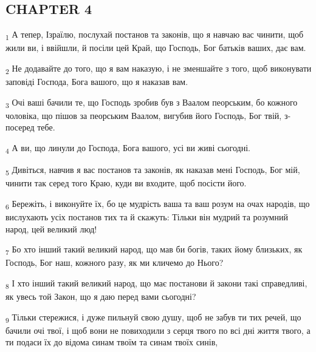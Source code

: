 \subsection{CHAPTER 4}
\begin{tcolorbox}
\textsubscript{1} А тепер, Ізраїлю, послухай постанов та законів, що я навчаю вас чинити, щоб жили ви, і ввійшли, й посіли цей Край, що Господь, Бог батьків ваших, дає вам.
\end{tcolorbox}
\begin{tcolorbox}
\textsubscript{2} Не додавайте до того, що я вам наказую, і не зменшайте з того, щоб виконувати заповіді Господа, Бога вашого, що я наказав вам.
\end{tcolorbox}
\begin{tcolorbox}
\textsubscript{3} Очі ваші бачили те, що Господь зробив був з Ваалом пеорським, бо кожного чоловіка, що пішов за пеорським Ваалом, вигубив його Господь, Бог твій, з-посеред тебе.
\end{tcolorbox}
\begin{tcolorbox}
\textsubscript{4} А ви, що линули до Господа, Бога вашого, усі ви живі сьогодні.
\end{tcolorbox}
\begin{tcolorbox}
\textsubscript{5} Дивіться, навчив я вас постанов та законів, як наказав мені Господь, Бог мій, чинити так серед того Краю, куди ви входите, щоб посісти його.
\end{tcolorbox}
\begin{tcolorbox}
\textsubscript{6} Бережіть, і виконуйте їх, бо це мудрість ваша та ваш розум на очах народів, що вислухають усіх постанов тих та й скажуть: Тільки він мудрий та розумний народ, цей великий люд!
\end{tcolorbox}
\begin{tcolorbox}
\textsubscript{7} Бо хто інший такий великий народ, що мав би богів, таких йому близьких, як Господь, Бог наш, кожного разу, як ми кличемо до Нього?
\end{tcolorbox}
\begin{tcolorbox}
\textsubscript{8} І хто інший такий великий народ, що має постанови й закони такі справедливі, як увесь той Закон, що я даю перед вами сьогодні?
\end{tcolorbox}
\begin{tcolorbox}
\textsubscript{9} Тільки стережися, і дуже пильнуй свою душу, щоб не забув ти тих речей, що бачили очі твої, і щоб вони не повиходили з серця твого по всі дні життя твого, а ти подаси їх до відома синам твоїм та синам твоїх синів,
\end{tcolorbox}
